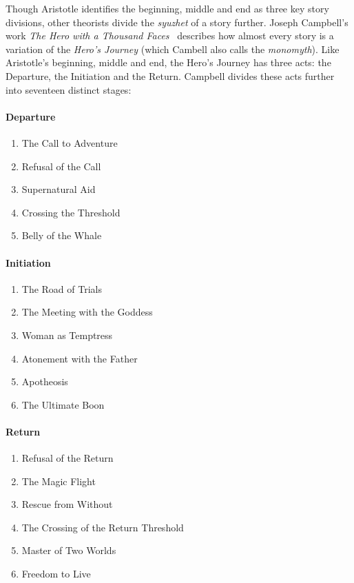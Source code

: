 \documentclass[11pt]{report}
\newcounter{myenumi}
\newenvironment{myenumerate}{\begin{enumerate} \setcounter{enumi}{\themyenumi}}{ \setcounter{myenumi}{\theenumi}\end{enumerate}}
\begin{document}
Though Aristotle identifies the beginning, middle and end as three key story
divisions, other theorists divide the \emph{syuzhet} of a story further. Joseph
Campbell's work \emph{The Hero with a Thousand Faces}~\citep{campbell2008hero}
describes how almost every story is a variation of the \emph{Hero's Journey}
(which Cambell also calls the \emph{monomyth}). Like Aristotle's beginning, middle and end,
the Hero's Journey has three acts: the Departure, the Initiation and the Return.
Campbell divides these acts further into seventeen distinct stages:

\paragraph{Departure}
\begin{myenumerate}
  \item The Call to Adventure
  \item Refusal of the Call
  \item Supernatural Aid
  \item Crossing the Threshold
  \item Belly of the Whale
\end{myenumerate}
\paragraph{Initiation}
\begin{myenumerate}
  \item The Road of Trials
  \item The Meeting with the Goddess
  \item Woman as Temptress
  \item Atonement with the Father
  \item Apotheosis
  \item The Ultimate Boon
\end{myenumerate}
\paragraph{Return}
\begin{myenumerate}
  \item Refusal of the Return
  \item The Magic Flight
  \item Rescue from Without
  \item The Crossing of the Return Threshold
  \item Master of Two Worlds
  \item Freedom to Live
\end{myenumerate}
\end{document}
